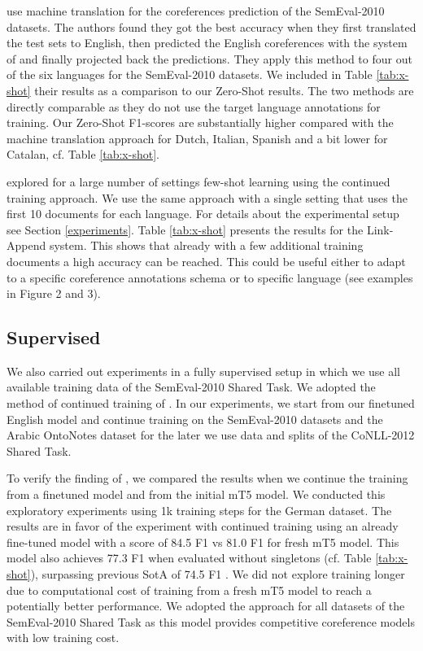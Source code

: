 \documentclass[11pt,a4paper]{article}
\begin{document}
 use machine translation for the coreferences prediction of the SemEval-2010 datasets. 
The authors found they got the best accuracy when they first translated the test sets to English, then predicted the English coreferences with the system of  and finally projected back the predictions. They apply this method to four out of the six languages for the SemEval-2010 datasets. We included in Table \ref{tab:x-shot} their results as a comparison to our Zero-Shot results. The two methods are directly comparable as they do not use the target language annotations for training. Our Zero-Shot F1-scores are substantially higher compared with the machine translation approach for Dutch, Italian, Spanish and a bit lower for Catalan, cf. Table \ref{tab:x-shot}. 

 explored for a large number of settings few-shot learning using the continued training approach. We use the same approach with a single setting that uses the first 10 documents for each language. For details about the experimental setup see Section \ref{experiments}. Table \ref{tab:x-shot} presents the results for the Link-Append system. 
This shows that already with a few additional training documents a high accuracy can be reached. This could be useful either to adapt to a specific coreference annotations schema or to specific language (see examples in Figure 2 and 3). 

\subsection{Supervised}

We also carried out experiments in a fully supervised setup in which we use all available training data of the SemEval-2010 Shared Task. We adopted the method of continued training of . In our experiments, we start from our finetuned English model and continue training on the SemEval-2010 datasets and the Arabic OntoNotes dataset for the later we use data and splits of the CoNLL-2012 Shared Task.  

To verify the finding of , we compared the results when we continue the training from a finetuned model and from the initial mT5 model. We conducted this exploratory experiments using 1k training steps for the German dataset. The results are in favor of the experiment with continued training using an already fine-tuned model with a score of 84.5 F1 vs 81.0 F1 for fresh mT5 model. This model also achieves 77.3 F1 when evaluated without singletons (cf. Table \ref {tab:x-shot}), surpassing previous SotA of 74.5 F1 \cite{schroder-etal-2021-neural}. We did not explore training longer due to computational cost of training from a fresh mT5 model to reach a potentially better performance. We adopted the approach for all datasets of the SemEval-2010 Shared Task as this model provides competitive coreference models with low training cost. 
\end{document}
